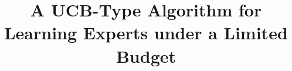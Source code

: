 \documentclass[a4paper,14pt]{extarticle}
\theoremstyle{plain}
\begin{document}
%

\title{A UCB-Type Algorithm for Learning Experts under a Limited Budget}
\end{document}
